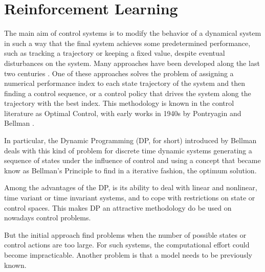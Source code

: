 \chapter{Reinforcement Learning}\label{cap:RL}
\vspace{-1cm}

%
%

The main aim of control systems is to modify the behavior of a dynamical system in such a way that the final system achieves some predetermined performance, such as tracking a trajectory or keeping a fixed value, despite eventual disturbances on the system. 
Many approaches have been developed along the last two 
centuries \citep{ogata2010}. 
One of these approaches solves the problem of assigning a numerical performance index to each state trajectory of the system and then finding a control sequence, or a control policy that drives the system along the trajectory with the best index. This methodology is known in the control literature as Optimal Control, with early works in 1940s by Pontryagin and Bellman \citep{bellmann1957}.  

In particular, the Dynamic Programming (DP, for short) introduced by Bellman deals with this kind of problem for discrete time dynamic systems generating a sequence of states under the influence of control and using a concept that became know as Bellman's Principle to find in a iterative fashion, the optimum solution. 

Among 
the advantages of the DP, is its ability to deal with linear and nonlinear, time variant or time invariant systems,  and to cope with restrictions on state or control spaces. This makes DP an attractive methodology do be used on nowadays control problems.

But the initial approach find problems when the number of possible states or control actions are too large. 
For such systems, the computational effort could become impracticable.
Another problem is that a model needs to be previously known.

